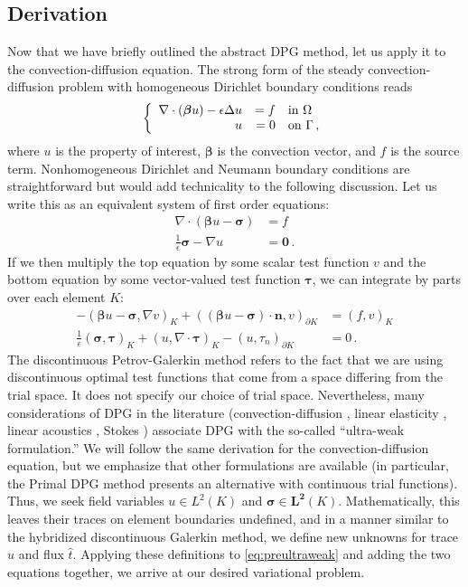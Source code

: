 \documentclass[letterpaper]{article}
\def\btau{\boldsymbol\tau}
\def\bfsigma{\boldsymbol\sigma}
\def\bbeta{\boldsymbol\beta}
\newcommand{\bs}[1]{\boldsymbol{#1}}
\newcommand{\eqnref}[1]{\eqref{eq:#1}}
\newcommand{\mb}[1]{\mathbf{#1}}
\newcommand{\del}{\Delta}
\newcommand{\grad}{\nabla}
\renewcommand{\div}{\grad \cdot}
\begin{document}
\subsection{Derivation}
Now that we have briefly outlined the abstract DPG method, let us apply it to
the convection-diffusion equation. The strong form of the steady
convection-diffusion problem with homogeneous Dirichlet boundary conditions reads
\[
\left\{
\begin{array}[c]{rrl}
\div(\bs\beta u)-\epsilon\del u & =f & \text{in }\Omega\\
u & =0 & \text{on }\Gamma\,,
\end{array}
\right.
\]
where $u$ is the property of interest, $\bs\beta$ is the convection vector,
and $f$ is the source term. Nonhomogeneous Dirichlet and Neumann boundary
conditions are straightforward but would add technicality to the following
discussion. Let us write this as an equivalent system of first
order equations:
\begin{align*}
\div(\bs\beta u-\bs\sigma)&=f\\
\frac{1}{\epsilon}\bs\sigma-\grad u&=\bs0\,.
\end{align*}
If we then multiply the top equation by some scalar test function $v$ and the
bottom equation by some vector-valued test function $\btau$, we can integrate by
parts over each element $K$:
\begin{equation}
\label{eq:preultraweak}
\begin{aligned}
-(\bbeta u-\bfsigma,\nabla v)_K+((\bbeta
u-\bfsigma)\cdot\mathbf{n},v)_{\partial K}&=(f,v)_K\\
\frac{1}{\epsilon}(\bfsigma,\btau)_K+(u,\nabla\cdot\btau)_K
-(u,\tau_n)_{\partial K}&=0\,.
\end{aligned}
\end{equation}
The discontinuous Petrov-Galerkin method refers to the fact that we are using
discontinuous optimal test functions that come from a space differing from the
trial space. It does not specify our choice of trial space. Nevertheless, many
considerations of DPG in the literature (convection-diffusion \cite{DPG6},
linear elasticity \cite{BramwellDemkowiczGopalakrishnanQiu11}, linear
acoustics \cite{DemkowiczGopalakrishnanMugaZitelli12}, Stokes
\cite{DPGStokes}) associate DPG with the so-called ``ultra-weak formulation.''
We will follow the same derivation for the convection-diffusion equation, but
we emphasize that other formulations are available (in particular, the
Primal DPG\cite{PrimalDPG} method presents an alternative with
continuous trial functions). Thus, we seek field variables $u\in L^2(K)$ and
$\bfsigma\in\mb{L^2}(K)$. Mathematically, this leaves their traces on element
boundaries undefined, and in a manner similar to the hybridized discontinuous
Galerkin method, we define new unknowns for trace $\hat u$ and flux $\hat t$.
Applying these definitions to \eqnref{preultraweak} and adding the two
equations together, we arrive at our desired variational problem.
\end{document}
